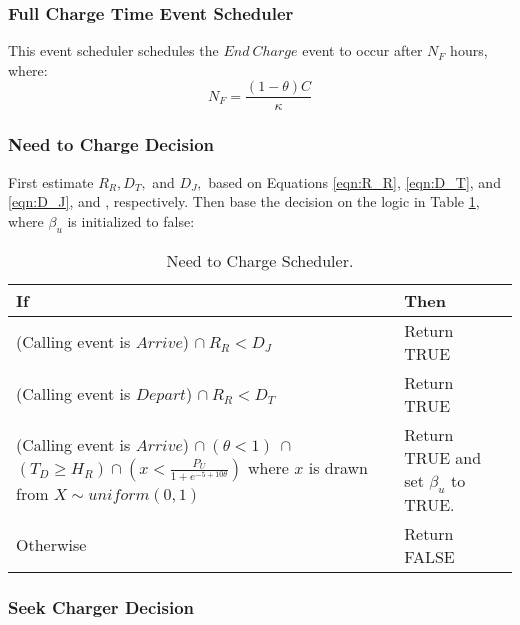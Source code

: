 \documentclass[journal]{IEEEtran}
\begin{document}
\subsubsection{Full Charge Time Event Scheduler}\label{fullSched}

This event scheduler schedules the $End ~Charge$ event to occur after $N_F$ hours, where:
\begin{equation}
  N_F = \frac{(1 - \theta) C}{\kappa}
\end{equation}

\subsubsection{Need to Charge Decision}\label{needDec}

First estimate $R_R, D_T,$ and $D_J,$ based on Equations \ref{eqn:R_R}, \ref{eqn:D_T}, and \ref{eqn:D_J}, and , respectively. Then base the decision on the logic in Table \ref{tab:needToCharge}, where $\beta_u$ is initialized to false:

\begin{table}[!h]
\def\colmarginA{5.5cm}
\def\colmarginB{2.5cm}
\renewcommand{\arraystretch}{1.3}
\caption{Need to Charge Scheduler.}
\label{tab:needToCharge}
\centering
\begin{tabular}{|ll|}
\hline
\textbf{If} & \textbf{Then} \\
\hline
\parbox[t]{\colmarginA}{ \raggedright  
  (Calling event is $Arrive$) $\cap ~ R_R < D_J$
  }  & \parbox[t]{\colmarginB}{ \raggedright 
  Return TRUE
} \\
\parbox[t]{\colmarginA}{ \raggedright  
  (Calling event is $Depart$) $\cap ~ R_R < D_T$
  }  & \parbox[t]{\colmarginB}{ \raggedright 
  Return TRUE
} \\
\parbox[t]{\colmarginA}{ \raggedright  
  (Calling event is $Arrive$) $\cap ~ (\theta < 1)~ \cap$
  $(T_D \ge H_R) \cap \left(x < \frac{P_U}{1 + e^{-5 + 10 \theta}}\right)$ where $x$ is drawn from $X \sim uniform(0,1)$
  }  & \parbox[t]{\colmarginB}{ \raggedright 
  Return TRUE and set $\beta_u$ to TRUE.
} \\
\parbox[t]{\colmarginA}{ \raggedright  
  Otherwise
  }  & \parbox[t]{\colmarginB}{ \raggedright 
  Return FALSE
} \\
\hline
\end{tabular}
\end{table}

\subsubsection{Seek Charger Decision}\label{seekDec}
\end{document}
